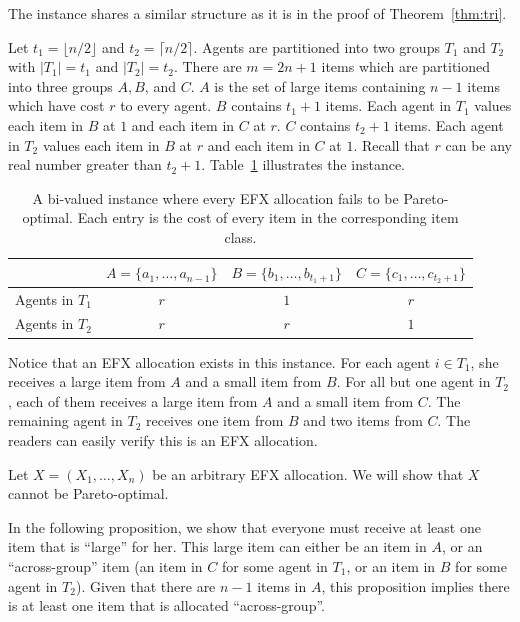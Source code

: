 \documentclass{article}
\theoremstyle{definition}
\begin{document}
The instance shares a similar structure as it is in the proof of Theorem~\ref{thm:tri}.

Let $t_1=\lfloor n/2\rfloor$ and $t_2=\lceil n/2\rceil$.
Agents are partitioned into two groups $T_1$ and $T_2$ with $|T_1|=t_1$ and $|T_2|=t_2$.
There are $m=2n+1$ items which are partitioned into three groups $A,B$, and $C$.
$A$ is the set of large items containing $n-1$ items which have cost $r$ to every agent.
$B$ contains $t_1+1$ items.
Each agent in $T_1$ values each item in $B$ at $1$ and each item in $C$ at $r$.
$C$ contains $t_2+1$ items.
Each agent in $T_2$ values each item in $B$ at $r$ and each item in $C$ at $1$.
Recall that $r$ can be any real number greater than $t_2+1$.
Table~\ref{tab:po} illustrates the instance.

\begin{table}[h]
    \centering
    \caption{A bi-valued instance where every EFX allocation fails to be Pareto-optimal.  Each entry is the cost of every item in the corresponding item class.}
    \begin{tabular}{cccc}
    \hline
         & $A=\{a_1,\ldots,a_{n-1}\}$ & $B=\{b_1,\ldots,b_{t_1+1}\}$ & $C=\{c_1,\ldots,c_{t_2+1}\}$\\
    \hline
       Agents in $T_1$ & $r$ & $1$ & $r$\\
       Agents in $T_2$ & $r$ & $r$ & $1$\\
    \hline
    \end{tabular}
    
    \label{tab:po}
\end{table}

Notice that an EFX allocation exists in this instance.
For each agent $i\in T_1$, she receives a large item from $A$ and a small item from $B$.
For all but one agent in $T_2$, each of them receives a large item from $A$ and a small item from $C$.
The remaining agent in $T_2$ receives one item from $B$ and two items from $C$.
The readers can easily verify this is an EFX allocation.

Let $X=(X_1,\ldots,X_n)$ be an arbitrary EFX allocation.
We will show that $X$ cannot be Pareto-optimal.

In the following proposition, we show that everyone must receive at least one item that is ``large'' for her.
This large item can either be an item in $A$, or an ``across-group'' item (an item in $C$ for some agent in $T_1$, or an item in $B$ for some agent in $T_2$).
Given that there are $n-1$ items in $A$, this proposition implies there is at least one item that is allocated ``across-group''.
\end{document}
